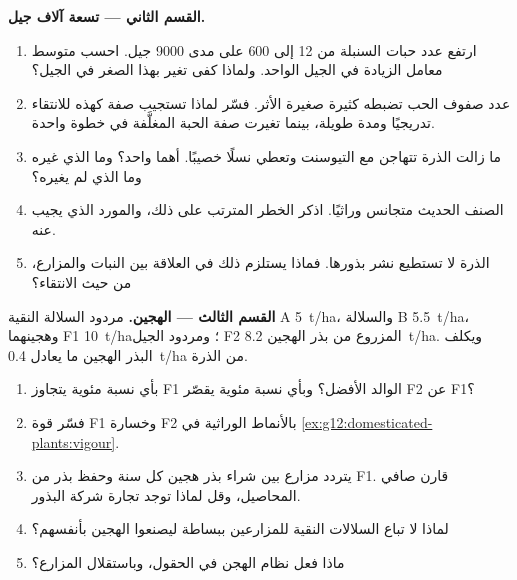 \begin{problem}
\medskip
\noindent\textbf{القسم الثاني --- تسعة آلاف جيل.}
\begin{enumerate}[resume]
  \item ارتفع عدد حبات السنبلة من 12 إلى 600 على مدى 9000 جيل. احسب
        متوسط معامل الزيادة في الجيل الواحد. ولماذا كفى تغير بهذا
        الصغر في الجيل؟
  \item عدد صفوف الحب تضبطه  كثيرة صغيرة الأثر. فسّر لماذا
        تستجيب صفة كهذه للانتقاء تدريجيًا ومدة طويلة، بينما تغيرت صفة
        الحبة المغلَّفة في خطوة واحدة.
  \item ما زالت الذرة تتهاجن مع التيوسنت وتعطي نسلًا خصيبًا. أهما 
        واحد؟ وما الذي غيره  وما الذي لم يغيره؟
  \item الصنف الحديث متجانس وراثيًا. اذكر الخطر المترتب على ذلك،
        والمورد الذي يجيب عنه.
  \item الذرة لا تستطيع نشر بذورها. فماذا يستلزم ذلك في العلاقة بين
        النبات والمزارع، من حيث الانتقاء؟
\end{enumerate}

\medskip
\noindent\textbf{القسم الثالث --- الهجين.}
مردود السلالة النقية A \qty{5}{t/ha}، والسلالة B \qty{5.5}{t/ha}،
وهجينهما F1 \qty{10}{t/ha}؛ ومردود الجيل F2 المزروع من بذر الهجين
\qty{8.2}{t/ha}. ويكلف البذر الهجين ما يعادل \qty{0.4}{t/ha}
من الذرة.
\begin{enumerate}[resume]
  \item بأي نسبة مئوية يتجاوز F1 الوالد الأفضل؟ وبأي نسبة مئوية يقصّر
        F2 عن F1؟
  \item فسّر قوة F1 وخسارة F2 بالأنماط الوراثية في
        \cref{ex:g12:domesticated-plants:vigour}.
  \item يتردد مزارع بين شراء بذر هجين كل سنة وحفظ بذر من F1. قارن صافي
        المحاصيل، وقل لماذا توجد تجارة شركة البذور.
  \item لماذا لا تباع السلالات النقية للمزارعين ببساطة ليصنعوا الهجين
        بأنفسهم؟
  \item ماذا فعل نظام الهجن  في الحقول، وباستقلال
        المزارع؟
\end{enumerate}


\end{problem}
